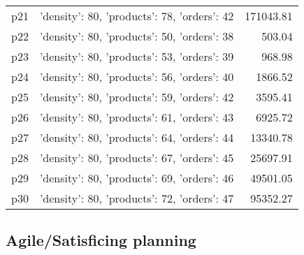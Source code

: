 \documentclass{article}
\begin{document}
\begin{center}
\begin{tabular}{@{}l|r|r@{}}
  p21&{'density': 80, 'products': 78, 'orders': 42}&171043.81\\
  p22&{'density': 80, 'products': 50, 'orders': 38}&503.04\\
  p23&{'density': 80, 'products': 53, 'orders': 39}&968.98\\
  p24&{'density': 80, 'products': 56, 'orders': 40}&1866.52\\
  p25&{'density': 80, 'products': 59, 'orders': 42}&3595.41\\
  p26&{'density': 80, 'products': 61, 'orders': 43}&6925.72\\
  p27&{'density': 80, 'products': 64, 'orders': 44}&13340.78\\
  p28&{'density': 80, 'products': 67, 'orders': 45}&25697.91\\
  p29&{'density': 80, 'products': 69, 'orders': 46}&49501.05\\
  p30&{'density': 80, 'products': 72, 'orders': 47}&95352.27
                            \end{tabular}
                            \end{center}
                    

                                \subsection*{Agile/Satisficing planning}
                                
\end{document}
